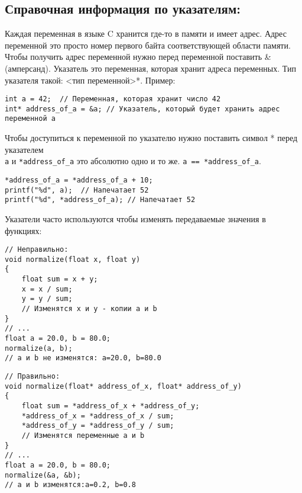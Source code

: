 \documentclass{article}
\begin{document}
\subsection*{Справочная информация по указателям:}
Каждая переменная в языке C хранится где-то в памяти и имеет адрес. Адрес переменной это просто номер первого байта соответствующей области памяти. Чтобы получить адрес переменной нужно перед переменной поставить \&(амперсанд).
Указатель это переменная, которая хранит адреса переменных. Тип указателя такой: <тип переменной>*. Пример:
\begin{verbatim}
int a = 42;  // Переменная, которая хранит число 42
int* address_of_a = &a; // Указатель, который будет хранить адрес переменной a
\end{verbatim}
Чтобы доступиться к переменной по указателю нужно поставить символ * перед указателем\\
\texttt{a} и \texttt{*address\_of\_a} это абсолютно одно и то же. \texttt{a  ==  *address\_of\_a}.
\begin{verbatim}
*address_of_a = *address_of_a + 10;
printf("%d", a);  // Напечатает 52
printf("%d", *address_of_a); // Напечатает 52
\end{verbatim}
Указатели часто используются чтобы изменять передаваемые значения в функциях:
\begin{multicols}{2}
\begin{verbatim}
// Неправильно:
void normalize(float x, float y)
{
    float sum = x + y;
    x = x / sum;
    y = y / sum; 
    // Изменятся x и y - копии a и b
}
// ...
float a = 20.0, b = 80.0;
normalize(a, b);
// a и b не изменятся: a=20.0, b=80.0
\end{verbatim}
\begin{verbatim}
// Правильно:
void normalize(float* address_of_x, float* address_of_y)
{
    float sum = *address_of_x + *address_of_y;
    *address_of_x = *address_of_x / sum;
    *address_of_y = *address_of_y / sum; 
    // Изменятся переменные a и b
}
// ...
float a = 20.0, b = 80.0;
normalize(&a, &b);
// a и b изменятся:a=0.2, b=0.8
\end{verbatim}
\end{multicols}
\end{document}
